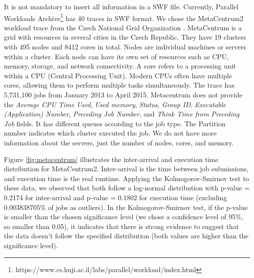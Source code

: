It is not mandatory to insert all information in a SWF file. Currently, Parallel Workloads Archive\footnote{https://www.cs.huji.ac.il/labs/parallel/workload/index.html} has 40 traces in SWF format. We chose the MetaCentrum2 workload trace from the Czech National Grid Organization \cite{klusavcek2015real}. MetaCentrum is a grid with resources in several cities in the Czech Republic. They have 19 clusters with 495 nodes and 8412 cores in total. Nodes are individual machines or servers within a cluster. Each node can have its own set of resources such as CPU, memory, storage, and network connectivity. A core refers to a processing unit within a CPU (Central Processing Unit). Modern CPUs often have multiple cores, allowing them to perform multiple tasks simultaneously. The trace has 5,731,100 jobs from January 2013 to April 2015. Metacentrum does not provide the \textit{Average CPU Time Used}, \textit{Used memory}, \textit{Status}, \textit{Group ID}, \textit{Executable (Application) Number}, \textit{Preceding Job Number}, and \textit{Think Time from Preceding Job} fields. It has different queues according to the job type. The Partition number indicates which cluster executed the job. We do not have more information about the servers, just the number of nodes, cores, and memory.

Figure \ref{fig:metacentrum} illustrates the inter-arrival and execution time distribution for MetaCentrum2. Inter-arrival is the time between job submissions, and execution time is the real runtime. Applying the Kolmogorov-Smirnov test to these data, we observed that both follow a log-normal distribution with p-value = 0.2174 for inter-arrival and p-value = 0.1802 for execution time (excluding 0.003838705\% of jobs as outliers). In the Kolmogorov-Smirnov test, if the p-value is smaller than the chosen significance level (we chose a confidence level of 95\%, so smaller than 0.05), it indicates that there is strong evidence to suggest that the data doesn't follow the specified distribution (both values are higher than the significance level).


